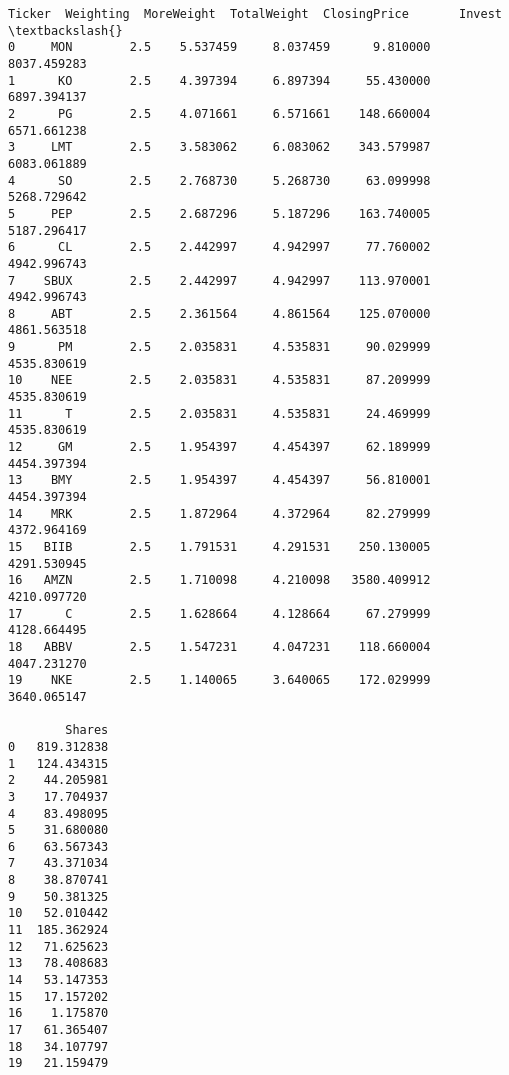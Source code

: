 \documentclass[11pt]{article}
\makeatletter
\newcommand{\boxspacing}{\kern\kvtcb@left@rule\kern\kvtcb@boxsep}
\newcommand{\prompt}[4]{
        {\ttfamily\llap{{\color{#2}[#3]:\hspace{3pt}#4}}\vspace{-\baselineskip}}
    }
\makeatother
\begin{document}
            \begin{tcolorbox}[breakable, size=fbox, boxrule=.5pt, pad at break*=1mm, opacityfill=0]
\prompt{Out}{outcolor}{49}{\boxspacing}
\begin{Verbatim}[commandchars=\\\{\}]
   Ticker  Weighting  MoreWeight  TotalWeight  ClosingPrice       Invest  \textbackslash{}
0     MON        2.5    5.537459     8.037459      9.810000  8037.459283
1      KO        2.5    4.397394     6.897394     55.430000  6897.394137
2      PG        2.5    4.071661     6.571661    148.660004  6571.661238
3     LMT        2.5    3.583062     6.083062    343.579987  6083.061889
4      SO        2.5    2.768730     5.268730     63.099998  5268.729642
5     PEP        2.5    2.687296     5.187296    163.740005  5187.296417
6      CL        2.5    2.442997     4.942997     77.760002  4942.996743
7    SBUX        2.5    2.442997     4.942997    113.970001  4942.996743
8     ABT        2.5    2.361564     4.861564    125.070000  4861.563518
9      PM        2.5    2.035831     4.535831     90.029999  4535.830619
10    NEE        2.5    2.035831     4.535831     87.209999  4535.830619
11      T        2.5    2.035831     4.535831     24.469999  4535.830619
12     GM        2.5    1.954397     4.454397     62.189999  4454.397394
13    BMY        2.5    1.954397     4.454397     56.810001  4454.397394
14    MRK        2.5    1.872964     4.372964     82.279999  4372.964169
15   BIIB        2.5    1.791531     4.291531    250.130005  4291.530945
16   AMZN        2.5    1.710098     4.210098   3580.409912  4210.097720
17      C        2.5    1.628664     4.128664     67.279999  4128.664495
18   ABBV        2.5    1.547231     4.047231    118.660004  4047.231270
19    NKE        2.5    1.140065     3.640065    172.029999  3640.065147

        Shares
0   819.312838
1   124.434315
2    44.205981
3    17.704937
4    83.498095
5    31.680080
6    63.567343
7    43.371034
8    38.870741
9    50.381325
10   52.010442
11  185.362924
12   71.625623
13   78.408683
14   53.147353
15   17.157202
16    1.175870
17   61.365407
18   34.107797
19   21.159479
\end{Verbatim}
\end{tcolorbox}
        
\end{document}
